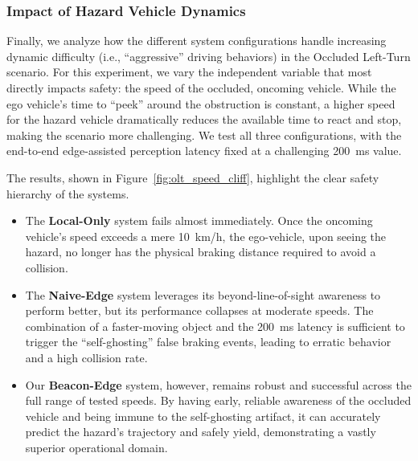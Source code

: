 



\subsubsection{Impact of Hazard Vehicle Dynamics}
\label{sec:hazard_dynamics}
Finally, we analyze how the different system configurations handle increasing dynamic difficulty (i.e., ``aggressive'' driving behaviors) in the Occluded Left-Turn scenario. For this experiment, we vary the independent variable that most directly impacts safety: the speed of the occluded, oncoming vehicle. While the ego vehicle's time to ``peek'' around the obstruction is constant, a higher speed for the hazard vehicle dramatically reduces the available time to react and stop, making the scenario more challenging. We test all three configurations, with the end-to-end edge-assisted perception latency fixed at a challenging 200~ms value.

The results, shown in Figure~\ref{fig:olt_speed_cliff}, highlight the clear safety hierarchy of the systems.
\begin{itemize}
    \item The \textbf{Local-Only} system fails almost immediately. Once the oncoming vehicle's speed exceeds a mere 10~km/h, the ego-vehicle, upon seeing the hazard, no longer has the physical braking distance required to avoid a collision.

    \item The \textbf{Naive-Edge} system leverages its beyond-line-of-sight awareness to perform better, but its performance collapses at moderate speeds. The combination of a faster-moving object and the 200~ms latency is sufficient to trigger the ``self-ghosting'' false braking events, leading to erratic behavior and a high collision rate. 

    \item Our \textbf{Beacon-Edge} system, however, remains robust and successful across the full range of tested speeds. By having early, reliable awareness of the occluded vehicle and being immune to the self-ghosting artifact, it can accurately predict the hazard's trajectory and safely yield, demonstrating a vastly superior operational domain.
\end{itemize}

